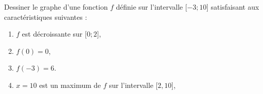 
\begin{exercice}\label{exosmath-0518}

    Dessiner le graphe d'une fonction \( f\) définie sur l'intervalle \( \mathopen[ -3 ;10 \mathclose]\)  satisfaisant aux caractéristiques suivantes :
    \begin{enumerate}
        \item
            \( f\) est décroissante sur \( \mathopen[ 0; 2 \mathclose]\),
        \item
            \( f(0)=0\),
        \item
            \( f(-3)=6\).
        \item
            \( x=10\) est un maximum de \( f\) sur l'intervalle $\mathopen[ 2 , 10 \mathclose]$,
    \end{enumerate}
    

\end{exercice}
